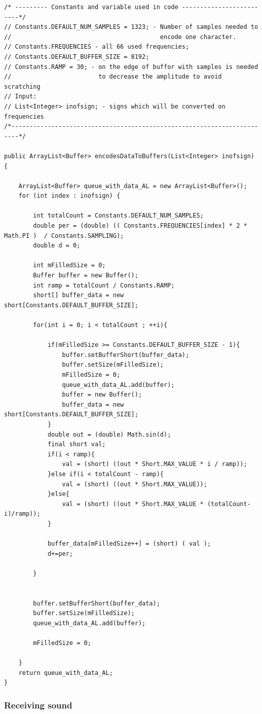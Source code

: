 \documentclass[11pt,titlepage]{article}
\theoremstyle{plain}
\begin{document}
\begin{lstlisting}
/* --------- Constants and variable used in code -------------------------*/
// Constants.DEFAULT_NUM_SAMPLES = 1323; - Number of samples needed to 	   
//										   encode one character.		   
// Constants.FREQUENCIES - all 66 used frequencies;						   
// Constants.DEFAULT_BUFFER_SIZE = 8192;								   
// Constants.RAMP = 30; - on the edge of buffor with samples is needed     
//						  to decrease the amplitude to avoid scratching    
// Input:																   
// List<Integer> inofsign; - signs which will be converted on frequencies  
/*------------------------------------------------------------------------*/

public ArrayList<Buffer> encodesDataToBuffers(List<Integer> inofsign) {

	ArrayList<Buffer> queue_with_data_AL = new ArrayList<Buffer>();
	for (int index : inofsign) {
		
		int totalCount = Constants.DEFAULT_NUM_SAMPLES; 
		double per = (double) (( Constants.FREQUENCIES[index] * 2 * Math.PI )  / Constants.SAMPLING);
		double d = 0;
		
		int mFilledSize = 0;
		Buffer buffer = new Buffer();
		int ramp = totalCount / Constants.RAMP;
		short[] buffer_data = new short[Constants.DEFAULT_BUFFER_SIZE];
		
		for(int i = 0; i < totalCount ; ++i){
		
			if(mFilledSize >= Constants.DEFAULT_BUFFER_SIZE - 1){
				buffer.setBufferShort(buffer_data);
				buffer.setSize(mFilledSize);
				mFilledSize = 0;
				queue_with_data_AL.add(buffer);
				buffer = new Buffer();
				buffer_data = new short[Constants.DEFAULT_BUFFER_SIZE];
			}
			double out = (double) Math.sin(d);
			final short val;
			if(i < ramp){
				val = (short) ((out * Short.MAX_VALUE * i / ramp));
			}else if(i < totalCount - ramp){
				val = (short) ((out * Short.MAX_VALUE));
			}else{
				val = (short) ((out * Short.MAX_VALUE * (totalCount-i)/ramp));
			}
			
			buffer_data[mFilledSize++] = (short) ( val );
			d+=per;
			
		}
		
		
		buffer.setBufferShort(buffer_data);
		buffer.setSize(mFilledSize);
		queue_with_data_AL.add(buffer);
		
		mFilledSize = 0;

	}
	return queue_with_data_AL;
}
\end{lstlisting} 


\subsubsection{Receiving sound}
\end{document}
